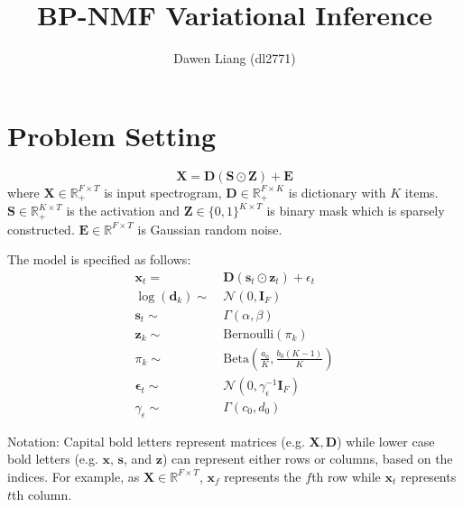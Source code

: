 \documentclass[11pt]{article} %
\title{BP-NMF Variational Inference}
\author{
Dawen Liang (dl2771)
}\date{}                                           %
\begin{document}
\maketitle

\section{Problem Setting}\label{sec:1} 
\[
\mathbf{X} = \mathbf{D} (\mathbf{S} \odot \mathbf{Z}) + \mathbf{E}
\]
where $\mathbf{X} \in \mathbb{R}_+^{F \times T}$ is input spectrogram, $\mathbf{D} \in \mathbb{R}_+^{F \times K}$ is dictionary with $K$ items. $\mathbf{S} \in \mathbb{R}_+^{K \times T}$ is the activation and $\mathbf{Z} \in \{0, 1\}^{K \times T}$ is binary mask which is sparsely constructed. $\mathbf{E} \in \mathbb{R}^{F \times T}$ is Gaussian random noise. 

The model is specified as follows:
\begin{align*}
\boldsymbol{x}_t = &~ \mathbf{D}(\boldsymbol{s}_t \odot \boldsymbol{z}_t) + \epsilon_t\\
\log (\boldsymbol{d}_k) \sim &~ \mathcal{N}(0, \mathbf{I}_F)\\ 
 \boldsymbol{s}_t \sim &~ \Gamma(\alpha, \beta)\\
\bm{z}_{k} \sim &~ \textrm{Bernoulli}(\pi_k)\\
\pi_k \sim &~ \textrm{Beta}(\frac{a_0}{K}, \frac{b_0 (K-1)}{K})\\
\bm{\epsilon}_t \sim &~ \mathcal{N}(0, \gamma_\epsilon^{-1} \mathbf{I}_F)\\
\gamma_\epsilon \sim &~ \Gamma(c_0, d_0)
\end{align*}

Notation:
Capital bold letters represent matrices (e.g. $\mathbf{X}, \mathbf{D}$) while lower case bold letters (e.g. $\bm{x}$, $\bm{s}$, and $\bm{z}$) can represent either rows or columns, based on the indices. For example, as $\mathbf{X} \in \mathbb{R}^{F \times T}$, $\bm{x}_f$ represents the $f$th row while $\bm{x}_t$ represents $t$th column.
\end{document}
